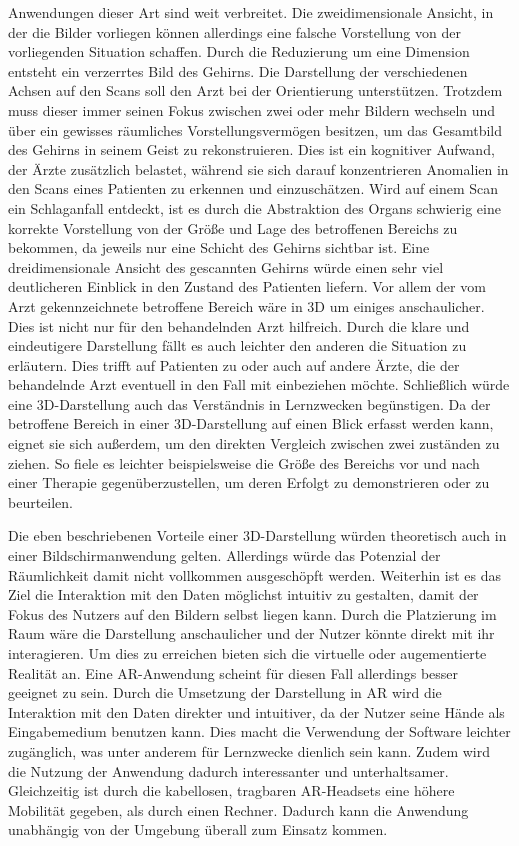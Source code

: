 Anwendungen dieser Art sind weit verbreitet. Die zweidimensionale Ansicht, in der die Bilder vorliegen können allerdings eine falsche Vorstellung von der vorliegenden Situation schaffen. 
Durch die Reduzierung um eine Dimension entsteht ein verzerrtes Bild des Gehirns. Die Darstellung der verschiedenen Achsen auf den Scans soll den Arzt bei der Orientierung unterstützen. Trotzdem muss dieser immer seinen Fokus zwischen zwei oder mehr Bildern wechseln und über ein gewisses räumliches Vorstellungsvermögen besitzen, um das Gesamtbild des Gehirns in seinem Geist zu rekonstruieren. Dies ist ein kognitiver Aufwand, der Ärzte zusätzlich belastet, während sie sich darauf konzentrieren Anomalien in den Scans eines Patienten zu erkennen und einzuschätzen. 
Wird auf einem Scan ein Schlaganfall entdeckt, ist es durch die Abstraktion des Organs schwierig eine korrekte Vorstellung von der Größe und Lage des betroffenen Bereichs zu bekommen, da jeweils nur eine Schicht des Gehirns sichtbar ist. 
Eine dreidimensionale Ansicht des gescannten Gehirns würde einen sehr viel deutlicheren Einblick in den Zustand des Patienten liefern. Vor allem der vom Arzt gekennzeichnete betroffene Bereich wäre in 3D um einiges anschaulicher.    Dies ist nicht nur für den behandelnden Arzt hilfreich. Durch die klare und eindeutigere Darstellung fällt es auch leichter den anderen die Situation zu erläutern. Dies trifft auf Patienten zu oder auch auf andere Ärzte, die der behandelnde Arzt eventuell in den Fall mit einbeziehen möchte.
Schließlich würde eine 3D-Darstellung auch das Verständnis in Lernzwecken begünstigen.
Da der betroffene Bereich in einer 3D-Darstellung auf einen Blick erfasst werden kann, eignet sie sich außerdem, um den direkten Vergleich zwischen zwei zuständen zu ziehen. So fiele es leichter beispielsweise die Größe des Bereichs vor und nach einer Therapie gegenüberzustellen, um deren Erfolgt zu demonstrieren oder zu beurteilen.

Die eben beschriebenen Vorteile einer 3D-Darstellung würden theoretisch auch in einer Bildschirmanwendung gelten. Allerdings würde das Potenzial der Räumlichkeit damit nicht vollkommen ausgeschöpft werden. 
Weiterhin ist es das Ziel die Interaktion mit den Daten möglichst intuitiv zu gestalten, damit der Fokus des Nutzers auf den Bildern selbst liegen kann.
Durch die Platzierung im Raum wäre die Darstellung anschaulicher und der Nutzer könnte direkt mit ihr interagieren. 
Um dies zu erreichen bieten sich die virtuelle oder augementierte Realität an. 
Eine AR-Anwendung scheint für diesen Fall allerdings besser geeignet zu sein. Durch die Umsetzung der Darstellung in AR wird die Interaktion mit den Daten direkter und intuitiver, da der Nutzer seine Hände als Eingabemedium benutzen kann. Dies macht die Verwendung der Software leichter zugänglich, was unter anderem für Lernzwecke dienlich sein kann.
Zudem wird die Nutzung der Anwendung dadurch interessanter und unterhaltsamer.
Gleichzeitig ist durch die kabellosen, tragbaren AR-Headsets eine höhere Mobilität gegeben, als durch einen Rechner. Dadurch kann die Anwendung unabhängig von der Umgebung überall zum Einsatz kommen. 

